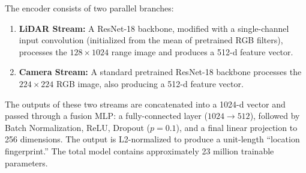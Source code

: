 The encoder consists of two parallel branches:
\begin{enumerate}
    \item \textbf{LiDAR Stream:} A ResNet-18 backbone, modified with a single-channel input convolution (initialized from the mean of pretrained RGB filters), processes the $128 \times 1024$ range image and produces a 512-d feature vector.
    \item \textbf{Camera Stream:} A standard pretrained ResNet-18 backbone processes the $224 \times 224$ RGB image, also producing a 512-d feature vector.
\end{enumerate}

The outputs of these two streams are concatenated into a 1024-d vector and passed through a fusion MLP: a fully-connected layer ($1024 \rightarrow 512$), followed by Batch Normalization, ReLU, Dropout ($p{=}0.1$), and a final linear projection to 256 dimensions. The output is L2-normalized to produce a unit-length ``location fingerprint.'' The total model contains approximately 23 million trainable parameters.

